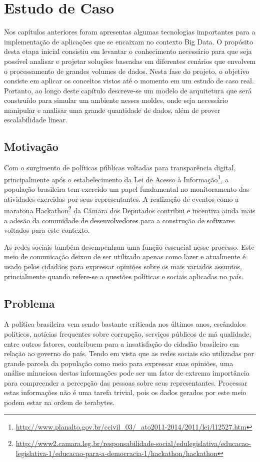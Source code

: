 \chapter{Estudo de Caso}
\label{cap:proposta}

Nos capítulos anteriores foram apresentas algumas tecnologias importantes para a implementação de aplicações que se encaixam no contexto Big Data. O propósito desta etapa inicial consistiu em levantar o conhecimento necessário para que seja possível analisar e projetar soluções baseadas em diferentes cenários que envolvem o processamento de grandes volumes de dados. Nesta fase do projeto, o objetivo consiste em aplicar os conceitos vistos até o momento em um estudo de caso real. Portanto, ao longo deste capítulo descreve-se um modelo de arquitetura que será construído para simular um ambiente nesses moldes, onde seja necessário manipular e analisar uma grande quantidade de dados, além de prover escalabilidade linear.

\section{Motivação}

Com o surgimento de políticas públicas voltadas para transparência digital, principalmente após o estabelecimento da Lei de Acesso à Informação\footnote{\url{http://www.planalto.gov.br/ccivil_03/_ato2011-2014/2011/lei/l12527.htm}}, a população brasileira tem exercido um papel fundamental no monitoramento das atividades exercidas por seus representantes. A realização de eventos como a maratona Hackathon\footnote{\url{http://www2.camara.leg.br/responsabilidade-social/edulegislativa/educacao-legislativa-1/educacao-para-a-democracia-1/hackathon/hackathon}} da Câmara dos Deputados contribui e incentiva ainda mais a adesão da comunidade de desenvolvedores para a construção de softwares voltados para este contexto.

As redes sociais também desempenham uma função essencial nesse processo. Este meio de comunicação deixou de ser utilizado apenas como lazer e atualmente é usado pelos cidadãos para expressar opiniões sobre os mais variados assuntos, princialmente quando refere-se a questões políticas e sociais aplicadas no país.

\section{Problema}

A política brasileira vem sendo bastante criticada nos últimos anos, escândalos políticos, notícias frequentes sobre corrupção, serviços públicos de má qualidade, entre outros fatores, contribuem para a insatisfação do cidadão brasileiro em relação ao governo do país. Tendo em vista que as redes sociais são utilizadas por grande parcela da população como meio para expressar suas opiniões, uma análise minuciosa destas informações pode ser um fator de extrema importância para compreender a percepção das pessoas sobre seus representantes. Processar estas informações não é uma tarefa trivial, pois os dados gerados por este meio podem estar na ordem de terabytes.

